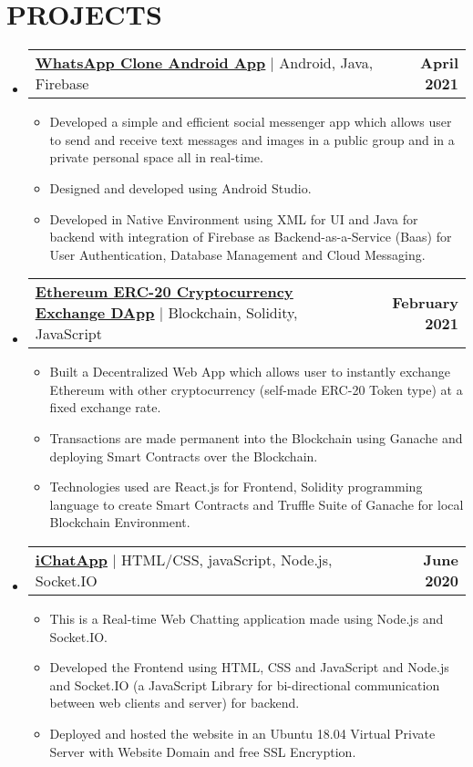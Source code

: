 \documentclass[letterpaper,11pt]{article}
\makeatletter
\newcommand{\resumeItem}[1]{
  \item\small{
    {#1 \vspace{-2pt}}
  }
}
\newcommand{\resumeProjectHeading}[2]{
    \item
    \begin{tabular*}{1.001\textwidth}{l@{\extracolsep{\fill}}r}
      \small#1 & \textbf{\small #2}\\
    \end{tabular*}\vspace{-7pt}
}
\newcommand{\resumeSubHeadingListStart}{\begin{itemize}[leftmargin=0.0in, label={}]}
\newcommand{\resumeSubHeadingListEnd}{\end{itemize}}
\newcommand{\resumeItemListStart}{\begin{itemize}}
\newcommand{\resumeItemListEnd}{\end{itemize}\vspace{-5pt}}
\makeatother
\begin{document}
\section{PROJECTS}
    \vspace{-5pt}
    \resumeSubHeadingListStart
      \resumeProjectHeading
          {\underline{\textbf{\href{https://github.com/SrirajBehera/WhatsApp-Clone-Android-App}{WhatsApp Clone Android App}}} $|$ {Android, Java, Firebase}}{April 2021}
          \resumeItemListStart
            \resumeItem{Developed a simple and efficient social messenger app which allows user to send and receive text messages and images in a public group and in a private personal space all in real-time.}
            \resumeItem{Designed and developed using Android Studio.}
            \resumeItem{Developed in Native Environment using XML for UI and Java for backend with integration of Firebase as Backend-as-a-Service (Baas) for User Authentication, Database Management and Cloud Messaging.}
          \resumeItemListEnd
          \vspace{-13pt}
      \resumeProjectHeading
          {\underline{\textbf{\href{https://github.com/SrirajBehera/Ethereum-ERC-20-CryptoCurrency-Exchange-DApp}{Ethereum ERC-20 Cryptocurrency Exchange DApp}}} $|$ {Blockchain, Solidity, JavaScript}}{February 2021}
          \resumeItemListStart
            \resumeItem{Built a Decentralized Web App which allows user to instantly exchange Ethereum with other cryptocurrency (self-made ERC-20 Token type) at a fixed exchange rate.}
            \resumeItem{Transactions are made permanent into the Blockchain using Ganache and deploying Smart Contracts over the Blockchain.}
            \resumeItem{Technologies used are React.js for Frontend, Solidity programming language to create Smart Contracts and Truffle Suite of Ganache for local Blockchain Environment.}
          \resumeItemListEnd 
          \vspace{-13pt}
          \resumeProjectHeading
          {\underline{\textbf{\href{https://github.com/SrirajBehera/iChatApp}{iChatApp}}} $|$ {HTML/CSS, javaScript, Node.js, Socket.IO}}{June 2020}
          \resumeItemListStart
            \resumeItem{This is a Real-time Web Chatting application made using Node.js and Socket.IO.}
            \resumeItem{Developed the Frontend using HTML, CSS and JavaScript and Node.js and Socket.IO (a JavaScript Library for bi-directional communication between web clients and server) for backend.}
            \resumeItem{Deployed and hosted the website in an Ubuntu 18.04 Virtual Private Server with Website Domain and free SSL Encryption.}
          \resumeItemListEnd 
    \resumeSubHeadingListEnd
\vspace{-15pt}
\end{document}
